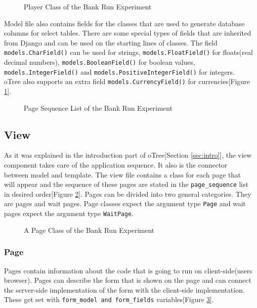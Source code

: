 \begin{figure}[h]
	\centerline{}
	\caption{Player Class of the Bank Run Experiment}
	\label{fig:picture8}
\end{figure}

Model file also contains fields for the classes that are used to generate database columns for select tables. There are some special types of fields that are inherited from Django and can be used on the starting lines of classes. The field \verb|models.CharField()| can be used for strings, \verb|models.FloatField()| for floats(real decimal numbers), \verb|models.BooleanField()| for boolean values, \verb|models.IntegerField()| and \verb|models.PositiveIntegerField()| for integers. oTree also supports an extra field \verb|models.CurrencyField()| for currencies[Figure \ref{fig:picture8}]. 

\begin{figure}[h]
	\centerline{}
	\caption{Page Sequence List of the Bank Run Experiment}
	\label{fig:picture9}
\end{figure}

\subsection{View}\label{sub:view}

As it was explained in the introduction part of oTree[Section \ref{sec:intro}], the view component takes care of the application sequence. It also is the connector between model and template. The view file contains a class for each page that  will appear and the sequence of these pages are stated in the \verb|page_sequence| list in desired order[Figure \ref{fig:picture9}]. Pages can be divided into two general categories. They are pages and wait pages. Page classes expect the argument type \verb|Page| and wait pages expect the argument type \verb|WaitPage|.

\begin{figure}[h]
	\centerline{}
	\caption{A Page Class of the Bank Run Experiment}
	\label{fig:picture10}
\end{figure}

\subsubsection{Page}\label{sub:page}

Pages contain information about the code that is going to run on client-side(users browser). Pages can describe the form that is shown on the page and can connect the server-side implementation of the form with the client-side implementation. These get set with \verb|form_model and form_fields| variables[Figure \ref{fig:picture10}].

